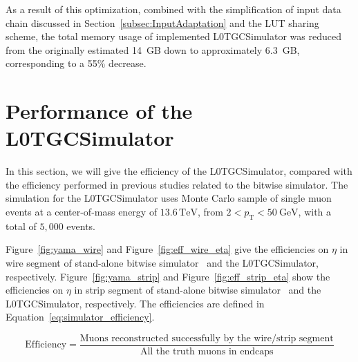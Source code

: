 As a result of this optimization, combined with the simplification of input data chain discussed in Section~\ref{subsec:InputAdaptation} and the LUT sharing scheme, the total memory usage of implemented L0TGCSimulator was reduced from the originally estimated 14~GB down to approximately 6.3~GB, corresponding to a 55\% decrease.

\section{Performance of the L0TGCSimulator} \label{sec:L0MuonS1TGCPerformance}
In this section, we will give the efficiency of the L0TGCSimulator, compared with the efficiency performed in previous studies related to the bitwise simulator. The simulation for the L0TGCSimulator uses Monte Carlo sample of single muon events at a center-of-mass energy of $13.6\,\mathrm{TeV}$, from $2 < p_\mathrm{T} < 50~\text{GeV}$, with a total of $5{,}000$ events.

Figure~\ref{fig:yama_wire} and Figure~\ref{fig:eff_wire_eta} give the efficiencies on $\eta$ in wire segment of stand-alone bitwise simulator~\cite{yamashita} and the L0TGCSimulator, respectively. Figure~\ref{fig:yama_strip} and Figure~\ref{fig:eff_strip_eta} show the efficiencies on $\eta$ in strip segment of stand-alone bitwise simulator~\cite{yamashita} and the L0TGCSimulator, respectively. The efficiencies are defined in Equation~\ref{eq:simulator_efficiency}. 

\begin{equation}
\label{eq:simulator_efficiency}
\mathrm{Efficiency} = \frac{\text{Muons reconstructed successfully by the wire/strip segment}}{\text{All the truth muons in endcaps}}
\end{equation}

